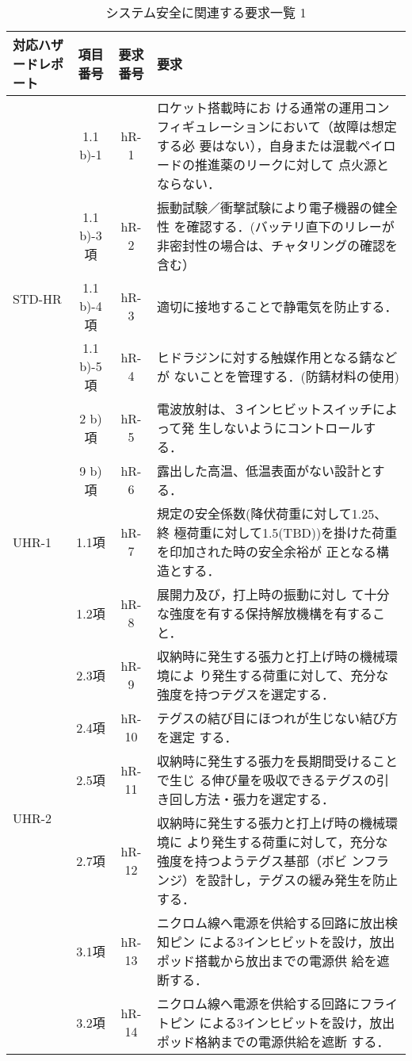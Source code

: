 \begin{table}[htb]
    \centering
    \caption{システム安全に関連する要求一覧 1}
    \begin{tabular}{|p{2cm}|c|c|p{8cm}|} \hline
        対応ハザードレポート& 項目番号 & 要求番号 & 要求 \\ \hline
        \multirow{6}{*}{STD-HR} & 1.1 b)-1 & hR-1 & ロケット搭載時にお
        ける通常の運用コンフィギュレーションにおいて（故障は想定する必
          要はない），自身または混載ペイロードの推進薬のリークに対して
        点火源とならない．\\ \cline{2-4}
        & 1.1 b)-3項 & hR-2 & 振動試験／衝撃試験により電子機器の健全性
        を確認する．(バッテリ直下のリレーが非密封性の場合は、チャタリングの確認を含む）
        \\ \cline{2-4}
        & 1.1 b)-4項 & hR-3 & 適切に接地することで静電気を防止する．\\ \cline{2-4}
        & 1.1 b)-5項 & hR-4 & ヒドラジンに対する触媒作用となる錆などが
        ないことを管理する．(防錆材料の使用) \\ \cline{2-4}
        & 2 b)項 & hR-5 & 電波放射は、３インヒビットスイッチによって発
        生しないようにコントロールする．\\ \cline{2-4}
        & 9 b)項 & hR-6 & 露出した高温、低温表面がない設計とする．
        \\ \hline
        UHR-1 & 1.1項 & hR-7 & 規定の安全係数(降伏荷重に対して1.25、終
        極荷重に対して1.5(TBD))を掛けた荷重を印加された時の安全余裕が
        正となる構造とする．\\ \hline 
        \multirow{7}{*}{UHR-2} & 1.2項 & hR-8 & 展開力及び，打上時の振動に対し
        て十分な強度を有する保持解放機構を有すること．\\ \cline{2-4}
        & 2.3項 & hR-9 & 収納時に発生する張力と打上げ時の機械環境によ
        り発生する荷重に対して、充分な強度を持つテグスを選定する．
        \\ \cline{2-4}
        & 2.4項 & hR-10 & テグスの結び目にほつれが生じない結び方を選定
        する．\\ \cline{2-4}
        & 2.5項 & hR-11 & 収納時に発生する張力を長期間受けることで生じ
        る伸び量を吸収できるテグスの引き回し方法・張力を選定する．
        \\ \cline{2-4}
         & 2.7項 & hR-12 & 収納時に発生する張力と打上げ時の機械環境に
        より発生する荷重に対して，充分な強度を持つようテグス基部（ボビ
          ンフランジ）を設計し，テグスの緩み発生を防止する．
        \\ \cline{2-4}
        & 3.1項 & hR-13 & ニクロム線へ電源を供給する回路に放出検知ピン
        による3インヒビットを設け，放出ポッド搭載から放出までの電源供
        給を遮断する．\\ \cline{2-4}
        & 3.2項 & hR-14 &ニクロム線へ電源を供給する回路にフライトピン
        による3インヒビットを設け，放出ポッド格納までの電源供給を遮断
        する．\\ \hline
    \end{tabular}
    \label{requirment_safety1}
\end{table}


